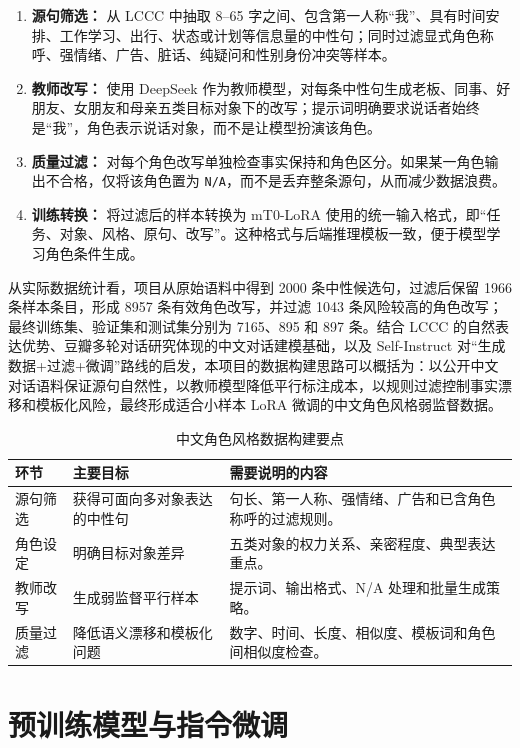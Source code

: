 \documentclass[12pt,a4paper]{ctexart}
\begin{document}
\begin{enumerate}[leftmargin=2em]
  \item \textbf{源句筛选：} 从 LCCC 中抽取 8--65 字之间、包含第一人称“我”、具有时间安排、工作学习、出行、状态或计划等信息量的中性句；同时过滤显式角色称呼、强情绪、广告、脏话、纯疑问和性别身份冲突等样本。
  \item \textbf{教师改写：} 使用 DeepSeek 作为教师模型，对每条中性句生成老板、同事、好朋友、女朋友和母亲五类目标对象下的改写；提示词明确要求说话者始终是“我”，角色表示说话对象，而不是让模型扮演该角色。
  \item \textbf{质量过滤：} 对每个角色改写单独检查事实保持和角色区分。如果某一角色输出不合格，仅将该角色置为 \texttt{N/A}，而不是丢弃整条源句，从而减少数据浪费。
  \item \textbf{训练转换：} 将过滤后的样本转换为 mT0-LoRA 使用的统一输入格式，即“任务、对象、风格、原句、改写”。这种格式与后端推理模板一致，便于模型学习角色条件生成。
\end{enumerate}

从实际数据统计看，项目从原始语料中得到 2000 条中性候选句，过滤后保留 1966 条样本条目，形成 8957 条有效角色改写，并过滤 1043 条风险较高的角色改写；最终训练集、验证集和测试集分别为 7165、895 和 897 条。结合 LCCC 的自然表达优势、豆瓣多轮对话研究体现的中文对话建模基础，以及 Self-Instruct 对“生成数据+过滤+微调”路线的启发，本项目的数据构建思路可以概括为：以公开中文对话语料保证源句自然性，以教师模型降低平行标注成本，以规则过滤控制事实漂移和模板化风险，最终形成适合小样本 LoRA 微调的中文角色风格弱监督数据。

\begin{table}[H]
\centering
\caption{中文角色风格数据构建要点}
\label{tab:dataset_building_points}
\begin{tabular}{p{3cm}|p{4.5cm}|p{5cm}}
\toprule
环节 & 主要目标 & 需要说明的内容 \\
\midrule
源句筛选 & 获得可面向多对象表达的中性句 & 句长、第一人称、强情绪、广告和已含角色称呼的过滤规则。 \\
角色设定 & 明确目标对象差异 & 五类对象的权力关系、亲密程度、典型表达重点。 \\
教师改写 & 生成弱监督平行样本 & 提示词、输出格式、N/A 处理和批量生成策略。 \\
质量过滤 & 降低语义漂移和模板化问题 & 数字、时间、长度、相似度、模板词和角色间相似度检查。 \\
\bottomrule
\end{tabular}
\end{table}

\section{预训练模型与指令微调}
\end{document}
